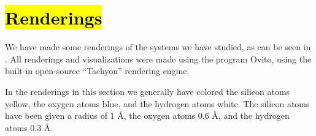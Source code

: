 \section[Renderings]{\hl{Renderings}}
We have made some renderings of the systems we have studied, as can be seen in . All renderings and visualizations were made using the program Ovito\cite{stukowski2010ovito}, using the built-in open-source ``Tachyon'' rendering engine.

In the renderings in this section we generally have colored the silicon atoms yellow, the oxygen atoms blue, and the hydrogen atoms white. The silicon atoms have been given a radius of 1 \AA, the oxygen atoms 0.6 \AA, and the hydrogen atoms 0.3 \AA.
%
